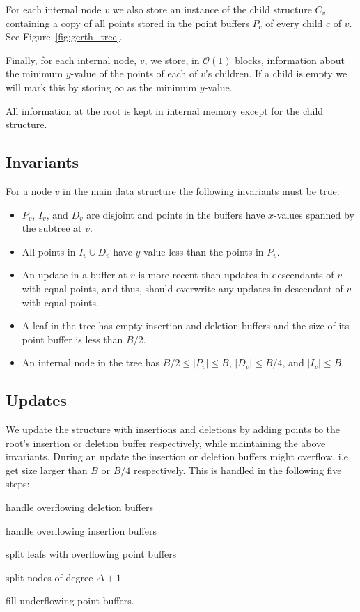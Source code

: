 \documentclass[twoside,11pt,openright]{report}
\begin{document}
For each internal node $v$ we also store an instance of the child structure $C_v$ containing a copy of all points stored in the point buffers $P_c$ of every child $c$ of $v$. See Figure~\ref{fig:gerth_tree}.

Finally, for each internal node, $v$, we store, in $\mathcal{O}(1)$ blocks, information about the minimum $y$-value of the points of each of $v$'s children. If a child is empty we will mark this by storing $\infty$ as the minimum $y$-value.

All information at the root is kept in internal memory except for the child structure.

\subsection{Invariants}
\label{subsec:brodal_invariants}
For a node $v$ in the main data structure the following invariants must be true:
\begin{itemize}
	\item $P_v$, $I_v$, and $D_v$ are disjoint and points in the buffers have $x$-values spanned by the subtree at $v$.
	\item All points in $I_v \cup D_v$ have $y$-value less than the points in $P_v$.
	\item An update in a buffer at $v$ is more recent than updates in descendants of $v$ with equal points, and thus, should overwrite any updates in descendant of $v$ with equal points.
	\item A leaf in the tree has empty insertion and deletion buffers and the size of its point buffer is less than $B/2$.
	\item An internal node in the tree has $B/2 \leq \vert P_v \vert \leq B$, $\vert D_v \vert \leq B/4$, and $\vert I_v \vert \leq B$.
\end{itemize}

\subsection{Updates}
\label{subsec:gerth_updates}
We update the structure with insertions and deletions by adding points to the root's insertion or deletion buffer respectively, while maintaining the above invariants.
During an update the insertion or deletion buffers might overflow, i.e get size larger than $B$ or $B/4$ respectively. This is handled in the following five steps:
\begin{inlinelist}
	\item handle overflowing deletion buffers
	\item handle overflowing insertion buffers
	\item split leafs with overflowing point buffers
	\item split nodes of degree $\Delta+1$
	\item fill underflowing point buffers.
\end{inlinelist}
\end{document}

